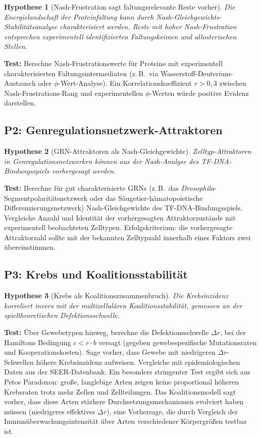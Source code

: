 \documentclass[12pt,a4paper]{article}
\newtheorem{hypothesis}{Hypothese}
\theoremstyle{remark}
\begin{document}
\begin{hypothesis}[Nash-Frustration sagt faltungsrelevante Reste vorher]
Die Energielandschaft der Proteinfaltung kann durch Nash-Gleichgewichts-Stabilit\"atsanalyse charakterisiert werden. Reste mit hoher Nash-Frustration entsprechen experimentell identifizierten Faltungskeimen und allosterischen Stellen.
\end{hypothesis}

\textbf{Test:} Berechne Nash-Frustrationswerte f\"ur Proteine mit experimentell charakterisierten Faltungsintermediaten (z.\,B.\ via Wasserstoff-Deuterium-Austausch oder $\phi$-Wert-Analyse). Ein Korrelationskoeffizient $r > 0{,}3$ zwischen Nash-Frustrations-Rang und experimentellen $\phi$-Werten w\"urde positive Evidenz darstellen.

\subsection{P2: Genregulationsnetzwerk-Attraktoren}

\begin{hypothesis}[GRN-Attraktoren als Nash-Gleichgewichte]
Zelltyp-Attraktoren in Genregulationsnetzwerken k\"onnen aus der Nash-Analyse des TF-DNA-Bindungsspiels vorhergesagt werden.
\end{hypothesis}

\textbf{Test:} Berechne f\"ur gut charakterisierte GRNs (z.\,B.\ das \textit{Drosophila}-Segmentpolarit\"atsnetzwerk oder das S\"augetier-h\"amatopoietische Differenzierungsnetzwerk) Nash-Gleichgewichte des TF-DNA-Bindungsspiels. Vergleiche Anzahl und Identit\"at der vorhergesagten Attraktorzust\"ande mit experimentell beobachteten Zelltypen. Erfolgskriterium: die vorhergesagte Attraktorzahl sollte mit der bekannten Zelltypzahl innerhalb eines Faktors zwei \"ubereinstimmen.

\subsection{P3: Krebs und Koalitionsstabilit\"at}

\begin{hypothesis}[Krebs als Koalitionszusammenbruch]
Die Krebsinzidenz korreliert invers mit der multizellul\"aren Koalitionsstabilit\"at, gemessen an der spieltheoretischen Defektionsschwelle.
\end{hypothesis}

\textbf{Test:} \"Uber Gewebetypen hinweg, berechne die Defektionsschwelle $\Delta r$, bei der Hamiltons Bedingung $c < r \cdot b$ versagt (gegeben gewebespezifische Mutationsraten und Kooperationskosten). Sage vorher, dass Gewebe mit niedrigeren $\Delta r$-Schwellen h\"ohere Krebsinzidenz aufweisen. Vergleiche mit epidemiologischen Daten aus der SEER-Datenbank. Ein besonders stringenter Test ergibt sich aus Petos Paradoxon: gro\ss{}e, langlebige Arten zeigen keine proportional h\"oheren Krebsraten trotz mehr Zellen und Zellteilungen. Das Koalitionsmodell sagt vorher, dass diese Arten st\"arkere Durchsetzungsmechanismen evolviert haben m\"ussen (niedrigeres effektives $\Delta r$), eine Vorhersage, die durch Vergleich der Immun\"uberwachungsintensit\"at \"uber Arten verschiedener K\"orpergr\"o\ss{}en testbar ist.
\end{document}
